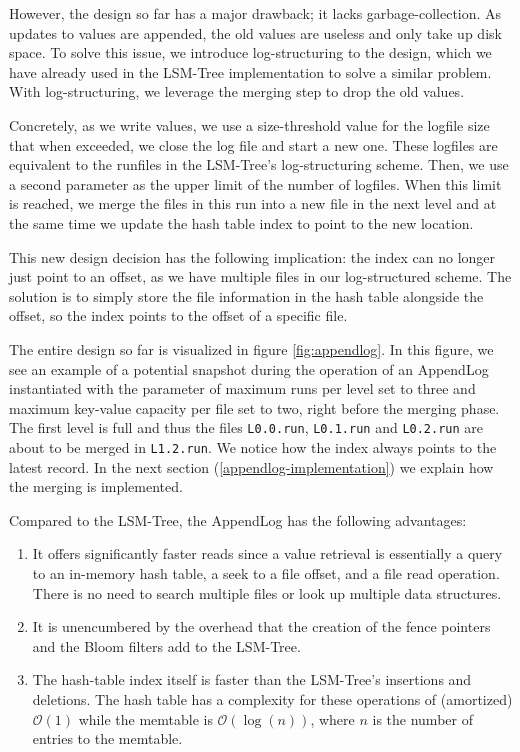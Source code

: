 However, the design so far has a major drawback; it lacks garbage-collection.
As updates to values are appended, the old values are useless and only take up disk space.
To solve this issue, we introduce log-structuring to the design, which we have already used in the LSM-Tree implementation to solve a similar problem.
With log-structuring, we leverage the merging step to drop the old values.

Concretely, as we write values, we use a size-threshold value for the logfile size that when exceeded, we close the log file and start a new one. These logfiles are equivalent to the runfiles in the LSM-Tree's log-structuring scheme.
Then, we use a second parameter as the upper limit of the number of logfiles.
When this limit is reached, we merge the files in this run into a new file in the next level and at the same time we update the hash table index to point to the new location.

This new design decision has the following implication: the index can no longer just point to an offset, as we have multiple files in our log-structured scheme.
The solution is to simply store the file information in the hash table alongside the offset, so the index points to the offset of a specific file.

The entire design so far is visualized in figure \ref{fig:appendlog}.
In this figure, we see an example of a potential snapshot during the operation of an AppendLog instantiated with the parameter of maximum runs per level set to three and maximum key-value capacity per file set to two, right before the merging phase. The first level is full and thus the files \verb|L0.0.run|, \verb|L0.1.run| and \verb|L0.2.run| are about to be merged in \verb|L1.2.run|.
We notice how the index always points to the latest record.
In the next section (\ref{appendlog-implementation}) we explain how the merging is implemented.

Compared to the LSM-Tree, the AppendLog has the following advantages:
\begin{enumerate}
    \item It offers significantly faster reads since a value retrieval is essentially a query to an in-memory hash table, a seek to a file offset, and a file read operation. There is no need to search multiple files or look up multiple data structures.
    \item It is unencumbered by the overhead that the creation of the fence pointers and the Bloom filters add to the LSM-Tree.
    \item The hash-table index itself is faster than the LSM-Tree's insertions and deletions. The hash table has a complexity for these operations of (amortized) $\mathcal{O}(1)$ while the memtable is $\mathcal{O}(\log{}(n))$, where $n$ is the number of entries to the memtable.
\end{enumerate}


